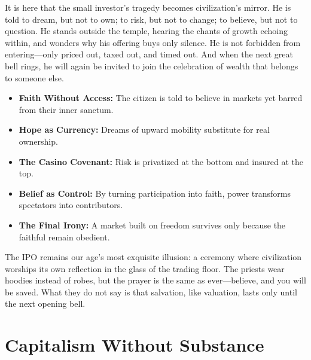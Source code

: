 \documentclass[11pt,twoside]{book}
\begin{document}
It is here that the small investor’s tragedy becomes civilization’s mirror.  
He is told to dream, but not to own; to risk, but not to change; to believe, but not to question.  
He stands outside the temple, hearing the chants of growth echoing within, and wonders why his offering buys only silence.  
He is not forbidden from entering—only priced out, taxed out, and timed out.  
And when the next great bell rings, he will again be invited to join the celebration of wealth that belongs to someone else.

\begin{tcolorbox}[
  title=\textbf{Public Faith, Private Profit},
  colback=white,
  colframe=black,
  fonttitle=\bfseries,
  top=0.5mm,
  bottom=0.5mm,
  left=3pt,
  right=3pt,
  before skip=4pt,
  after skip=6pt,
  arc=1mm,
  boxrule=0.4pt
  ]
\setlength{\itemsep}{1pt}
\setlength{\parskip}{0pt}
\begin{itemize}
  \item \textbf{Faith Without Access:} The citizen is told to believe in markets yet barred from their inner sanctum.  
  \item \textbf{Hope as Currency:} Dreams of upward mobility substitute for real ownership.  
  \item \textbf{The Casino Covenant:} Risk is privatized at the bottom and insured at the top.  
  \item \textbf{Belief as Control:} By turning participation into faith, power transforms spectators into contributors.  
  \item \textbf{The Final Irony:} A market built on freedom survives only because the faithful remain obedient.  
\end{itemize}
\end{tcolorbox}

The IPO remains our age’s most exquisite illusion: a ceremony where civilization worships its own reflection in the glass of the trading floor.  The priests wear hoodies instead of robes, but the prayer is the same as ever—believe, and you will be saved.  What they do not say is that salvation, like valuation, lasts only until the next opening bell.

\part{Capitalism Without Substance}

\end{document}
